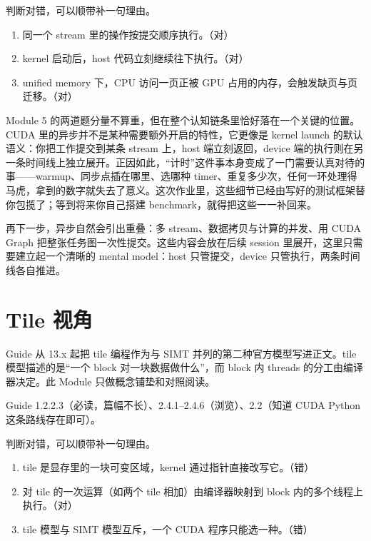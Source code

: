 \documentclass[11pt,a4paper,fontset=none]{ctexart}
\begin{document}
判断对错，可以顺带补一句理由。
\begin{enumerate}[label=(\alph*)]
  \item 同一个 stream 里的操作按提交顺序执行。（对）
  \item kernel 启动后，host 代码立刻继续往下执行。（对）
  \item unified memory 下，CPU 访问一页正被 GPU 占用的内存，会触发缺页与页迁移。（对）
\end{enumerate}

\begin{lookback}
  Module 5 的两道题分量不算重，但在整个认知链条里恰好落在一个关键的位置。CUDA 里的异步并不是某种需要额外开启的特性，它更像是 kernel launch 的默认语义：你把工作提交到某条 stream 上，host 端立刻返回，device 端的执行则在另一条时间线上独立展开。正因如此，“计时”这件事本身变成了一门需要认真对待的事——warmup、同步点插在哪里、选哪种 timer、重复多少次，任何一环处理得马虎，拿到的数字就失去了意义。这次作业里，这些细节已经由写好的测试框架替你包揽了；等到将来你自己搭建 benchmark，就得把这些一一补回来。

  再下一步，异步自然会引出重叠：多 stream、数据拷贝与计算的并发、用 CUDA Graph 把整张任务图一次性提交。这些内容会放在后续 session 里展开，这里只需要建立起一个清晰的 mental model：host 只管提交，device 只管执行，两条时间线各自推进。
\end{lookback}

\section{Tile 视角}

Guide 从 13.x 起把 tile 编程作为与 SIMT 并列的第二种官方模型写进正文。tile 模型描述的是“一个 block 对一块数据做什么”，而 block 内 threads 的分工由编译器决定。此 Module 只做概念铺垫和对照阅读。

\begin{reading}
  Guide 1.2.2.3（必读，篇幅不长）、2.4.1--2.4.6（浏览）、2.2（知道 CUDA Python 这条路线存在即可）。
\end{reading}

判断对错，可以顺带补一句理由。
\begin{enumerate}[label=(\alph*)]
  \item tile 是显存里的一块可变区域，kernel 通过指针直接改写它。（错）
  \item 对 tile 的一次运算（如两个 tile 相加）由编译器映射到 block 内的多个线程上执行。（对）
  \item tile 模型与 SIMT 模型互斥，一个 CUDA 程序只能选一种。（错）
\end{enumerate}
\end{document}
